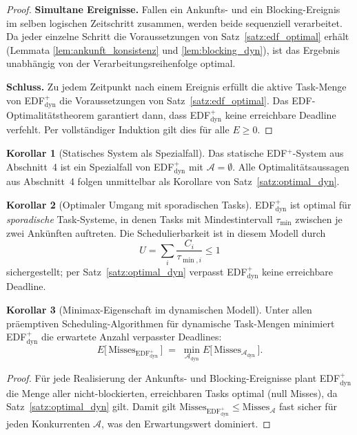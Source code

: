 ﻿\documentclass[a4paper,12pt]{article}
\theoremstyle{definition}
\newtheorem{korollar}{Korollar}
\begin{document}
\begin{proof}
		\medskip
		\textbf{Simultane Ereignisse.}
		Fallen ein Ankunfts- und ein Blocking-Ereignis im selben logischen Zeitschritt
		zusammen, werden beide sequenziell verarbeitet. Da jeder einzelne Schritt
		die Voraussetzungen von Satz~\ref{satz:edf_optimal} erhält (Lemmata
		\ref{lem:ankunft_konsistenz} und \ref{lem:blocking_dyn}), ist das Ergebnis
		unabhängig von der Verarbeitungsreihenfolge optimal.

		\medskip
		\textbf{Schluss.} Zu jedem Zeitpunkt nach einem Ereignis erfüllt die
		aktive Task-Menge von EDF$^+_{\mathrm{dyn}}$ die Voraussetzungen von
		Satz~\ref{satz:edf_optimal}. Das EDF-Optimalitätstheorem garantiert
		dann, dass EDF$^+_{\mathrm{dyn}}$ keine erreichbare Deadline verfehlt.
		Per vollständiger Induktion gilt dies für alle $E \ge 0$.
	\end{proof}

	\begin{korollar}[Statisches System als Spezialfall]
		\label{kor:statisch_spezialfall}
		Das statische EDF$^+$-System aus Abschnitt~4 ist ein Spezialfall von
		EDF$^+_{\mathrm{dyn}}$ mit $\mathcal{A} = \emptyset$. Alle Optimalitäts\-aussagen
		aus Abschnitt~4 folgen unmittelbar als Korollare von
		Satz~\ref{satz:optimal_dyn}.
	\end{korollar}

	\begin{korollar}[Optimaler Umgang mit sporadischen Tasks]
		\label{kor:sporadic}
		EDF$^+_{\mathrm{dyn}}$ ist optimal für \emph{sporadische} Task-Systeme, in denen
		Tasks mit Mindestintervall $\tau_{\min}$ zwischen je zwei Ankünften auftreten.
		Die Schedulierbarkeit ist in diesem Modell durch
		\[
		U = \sum_{i} \frac{C_i}{\tau_{\min,i}} \le 1
		\]
		sichergestellt; per Satz~\ref{satz:optimal_dyn} verpasst EDF$^+_{\mathrm{dyn}}$
		keine erreichbare Deadline.
	\end{korollar}

	\begin{korollar}[Minimax-Eigenschaft im dynamischen Modell]
		\label{kor:minimax_dyn}
		Unter allen präemptiven Scheduling-Algorithmen für dynamische Task-Mengen
		minimiert EDF$^+_{\mathrm{dyn}}$ die erwartete Anzahl verpasster Deadlines:
		\[
		E\bigl[\,\text{Misses}_{\text{EDF}^+_{\mathrm{dyn}}}\,\bigr] \;=\;
		\min_{\mathcal{A}_{\mathrm{dyn}}} E\bigl[\,\text{Misses}_{\mathcal{A}_{\mathrm{dyn}}}\,\bigr].
		\]
	\end{korollar}

	\begin{proof}
		Für jede Realisierung der Ankunfts- und Blocking-Ereignisse plant
		EDF$^+_{\mathrm{dyn}}$ die Menge aller nicht-blockierten, erreichbaren Tasks
		optimal (null Misses), da Satz~\ref{satz:optimal_dyn} gilt.
		Damit gilt $\text{Misses}_{\text{EDF}^+_{\mathrm{dyn}}} \le \text{Misses}_{\mathcal{A}}$
		fast sicher für jeden Konkurrenten $\mathcal{A}$, was den Erwartungswert dominiert.
	\end{proof}
\end{document}
